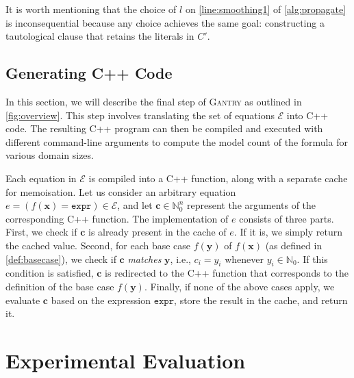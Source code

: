 \documentclass[a4paper,UKenglish,cleveref, autoref, thm-restate]{lipics-v2021}
\newcommand{\expr}{\mathtt{expr}}
\newcommand{\Cranetwo}{\textsc{Gantry}}
\begin{document}
It is worth mentioning that the choice of $l$ on \autoref{line:smoothing1} of
\cref{alg:propagate} is inconsequential because any choice achieves the same
goal: constructing a tautological clause that retains the literals in $C'$.

\subsection{Generating C++ Code}\label{sec:cpp}

In this section, we will describe the final step of \Cranetwo{} as outlined in
\cref{fig:overview}. This step involves translating the set of equations
$\mathcal{E}$ into C++ code. The resulting C++ program can then be compiled and
executed with different command-line arguments to compute the model count of the
formula for various domain sizes.

Each equation in $\mathcal{E}$ is compiled into a C++ function, along with a
separate cache for memoisation. Let us consider an arbitrary equation
$e = (f(\mathbf{x}) = \expr{}) \in \mathcal{E}$, and let
$\mathbf{c} \in \mathbb{N}_{0}^{n}$ represent the arguments of the corresponding
C++ function. The implementation of $e$ consists of three parts. First, we check
if $\mathbf{c}$ is already present in the cache of $e$. If it is, we simply
return the cached value. Second, for each base case $f(\mathbf{y})$ of
$f(\mathbf{x})$ (as defined in \cref{def:basecase}), we check if $\mathbf{c}$
\emph{matches} $\mathbf{y}$, i.e., $c_{i} = y_{i}$ whenever
$y_{i} \in \mathbb{N}_{0}$. If this condition is satisfied, $\mathbf{c}$ is
redirected to the C++ function that corresponds to the definition of the base
case $f(\mathbf{y})$. Finally, if none of the above cases apply, we evaluate
$\mathbf{c}$ based on the expression $\expr{}$, store the result in the cache,
and return it.

\section{Experimental Evaluation}\label{sec:experiments}



\end{document}
